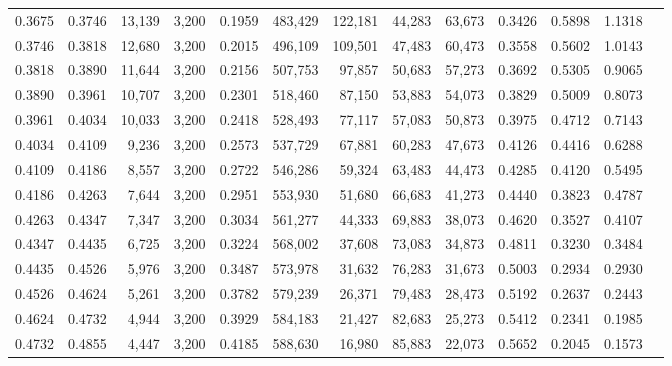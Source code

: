 \begin{tabular}{rrrrrrrrrrrrr}
0.3675 & 0.3746 &  13,139 & 3,200 &                                     0.1959 & 483,429 & 122,181 &  44,283 &  63,673 & 0.3426 & 0.5898 & 1.1318 \\
0.3746 & 0.3818 &  12,680 & 3,200 &                                     0.2015 & 496,109 & 109,501 &  47,483 &  60,473 & 0.3558 & 0.5602 & 1.0143 \\
0.3818 & 0.3890 &  11,644 & 3,200 &                                     0.2156 & 507,753 &  97,857 &  50,683 &  57,273 & 0.3692 & 0.5305 & 0.9065 \\
0.3890 & 0.3961 &  10,707 & 3,200 &                                     0.2301 & 518,460 &  87,150 &  53,883 &  54,073 & 0.3829 & 0.5009 & 0.8073 \\
0.3961 & 0.4034 &  10,033 & 3,200 &                                     0.2418 & 528,493 &  77,117 &  57,083 &  50,873 & 0.3975 & 0.4712 & 0.7143 \\
0.4034 & 0.4109 &   9,236 & 3,200 &                                     0.2573 & 537,729 &  67,881 &  60,283 &  47,673 & 0.4126 & 0.4416 & 0.6288 \\
0.4109 & 0.4186 &   8,557 & 3,200 &                                     0.2722 & 546,286 &  59,324 &  63,483 &  44,473 & 0.4285 & 0.4120 & 0.5495 \\
0.4186 & 0.4263 &   7,644 & 3,200 &                                     0.2951 & 553,930 &  51,680 &  66,683 &  41,273 & 0.4440 & 0.3823 & 0.4787 \\
0.4263 & 0.4347 &   7,347 & 3,200 &                                     0.3034 & 561,277 &  44,333 &  69,883 &  38,073 & 0.4620 & 0.3527 & 0.4107 \\
0.4347 & 0.4435 &   6,725 & 3,200 &                                     0.3224 & 568,002 &  37,608 &  73,083 &  34,873 & 0.4811 & 0.3230 & 0.3484 \\
0.4435 & 0.4526 &   5,976 & 3,200 &                                     0.3487 & 573,978 &  31,632 &  76,283 &  31,673 & 0.5003 & 0.2934 & 0.2930 \\
0.4526 & 0.4624 &   5,261 & 3,200 &                                     0.3782 & 579,239 &  26,371 &  79,483 &  28,473 & 0.5192 & 0.2637 & 0.2443 \\
0.4624 & 0.4732 &   4,944 & 3,200 &                                     0.3929 & 584,183 &  21,427 &  82,683 &  25,273 & 0.5412 & 0.2341 & 0.1985 \\
0.4732 & 0.4855 &   4,447 & 3,200 &                                     0.4185 & 588,630 &  16,980 &  85,883 &  22,073 & 0.5652 & 0.2045 & 0.1573 \\

\end{tabular}
